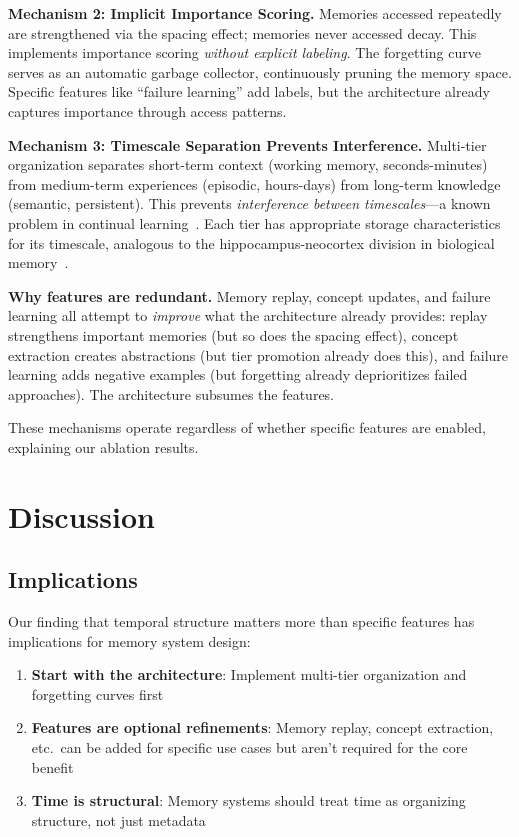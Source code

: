 \documentclass[11pt]{article}
\begin{document}
\textbf{Mechanism 2: Implicit Importance Scoring.}
Memories accessed repeatedly are strengthened via the spacing effect; memories never accessed decay. This implements importance scoring \textit{without explicit labeling}. The forgetting curve serves as an automatic garbage collector, continuously pruning the memory space. Specific features like ``failure learning'' add labels, but the architecture already captures importance through access patterns.

\textbf{Mechanism 3: Timescale Separation Prevents Interference.}
Multi-tier organization separates short-term context (working memory, seconds-minutes) from medium-term experiences (episodic, hours-days) from long-term knowledge (semantic, persistent). This prevents \textit{interference between timescales}---a known problem in continual learning~\citep{kirkpatrick2017catastrophic}. Each tier has appropriate storage characteristics for its timescale, analogous to the hippocampus-neocortex division in biological memory~\citep{mcclelland1995complementary}.

\textbf{Why features are redundant.} Memory replay, concept updates, and failure learning all attempt to \textit{improve} what the architecture already provides: replay strengthens important memories (but so does the spacing effect), concept extraction creates abstractions (but tier promotion already does this), and failure learning adds negative examples (but forgetting already deprioritizes failed approaches). The architecture subsumes the features.

These mechanisms operate regardless of whether specific features are enabled, explaining our ablation results.

\section{Discussion}

\subsection{Implications}

Our finding that temporal structure matters more than specific features has implications for memory system design:

\begin{enumerate}
    \item \textbf{Start with the architecture}: Implement multi-tier organization and forgetting curves first
    \item \textbf{Features are optional refinements}: Memory replay, concept extraction, etc.\ can be added for specific use cases but aren't required for the core benefit
    \item \textbf{Time is structural}: Memory systems should treat time as organizing structure, not just metadata
\end{enumerate}
\end{document}

